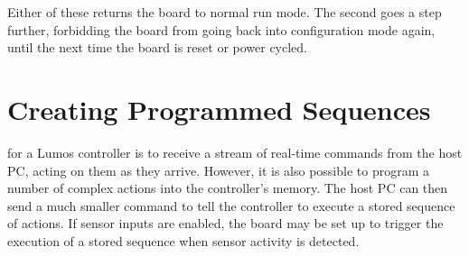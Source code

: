 \documentclass[letterpaper,twoside,onecolumn,openright,final]{memoir}
\begin{document}
Either of these returns the board to normal run mode.  The second goes a step further, forbidding
the board from going back into configuration mode again, until the next time the board is reset or
power cycled.

\chapter{Creating Programmed Sequences}\label{ch:sequences}
 for a Lumos controller is to receive a stream
of real-time commands from the host PC, acting on them as they arrive.  However, it is 
also possible to program a number of complex actions into the controller's memory.  The
host PC can then send a much smaller command to tell the controller to execute a stored
sequence of actions.  If sensor inputs are enabled, the board may be set up to trigger the
execution of a stored sequence when sensor activity is detected.

\end{document}
